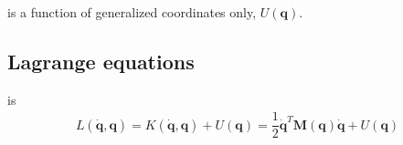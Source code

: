 \documentclass[letterpaper,10pt,english]{jupyterBook}
\begin{document}
\sphinxAtStartPar
{} is a function of generalized coordinates only, \(U(\mathbf{q})\).


\subsection{Lagrange equations}
\label{\detokenize{ch/lagrange-properties:lagrange-equations}}\label{\detokenize{ch/lagrange-properties:classical-mechanics-lagrange-properties-lagrange-equations}}
\sphinxAtStartPar
{} is
\begin{equation*}
\begin{split}L(\dot{\mathbf{q}}, \mathbf{q}) = K(\dot{\mathbf{q}}, \mathbf{q}) + U(\mathbf{q}) = \dfrac{1}{2} \dot{\mathbf{q}}^T \mathbf{M}(\mathbf{q}) \dot{\mathbf{q}} + U\left(\mathbf{q} \right)\end{split}
\end{equation*}
\end{document}
